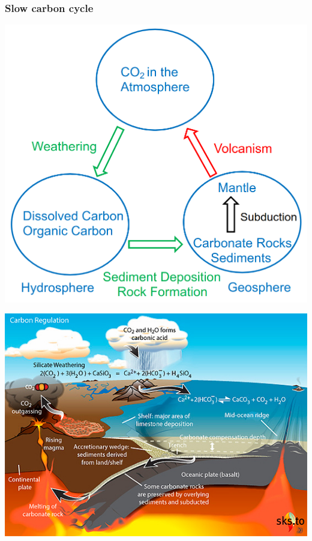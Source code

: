 \documentclass[11pt]{article}
\begin{document}
\subsubsection{Slow carbon cycle}
\label{sec:orgc5fc2ec}
\begin{center}
\includegraphics[scale=0.6]{./images/slow-carbon-cycle-diagram.png}
\end{center}

\begin{center}
\includegraphics[width=.9\linewidth]{./images/slow-carbon-cycle-picture.jpg}
\end{center}
\end{document}
